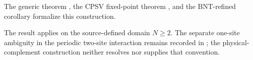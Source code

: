 \documentclass{article}
\begin{document}
The generic theorem
,
the CPSV fixed-point theorem
,
and the BNT-refined corollary
 formalize
this construction.

The result applies on the source-defined domain $N\geq2$. The separate
one-site ambiguity in the periodic two-site interaction remains recorded in
; the
physical-complement construction neither resolves nor supplies that convention.



\end{document}
